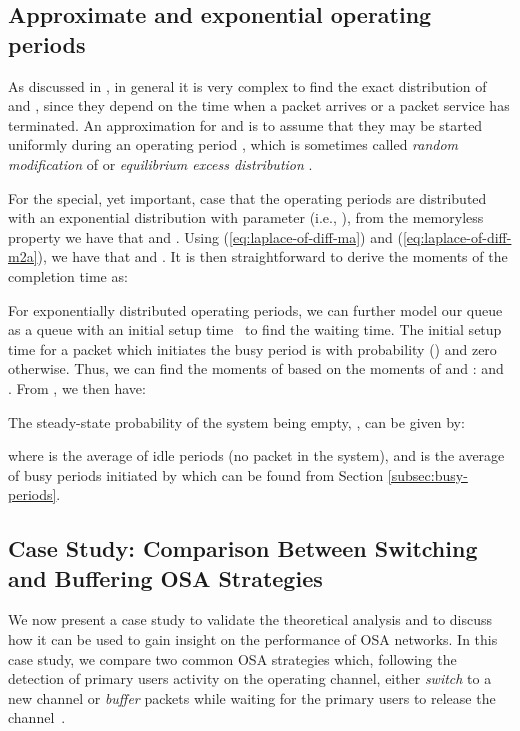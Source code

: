 \documentclass[11pt,journal,oneside,onecolumn,draftclsnofoot]{IEEEtran}
\begin{document}
\subsection{Approximate and exponential operating periods}
\label{subsec:Exp-Av-periods}

As discussed in \cite{federgruen86}, in general it is very complex to find the exact distribution of  and , since they depend on the time when a packet arrives or a packet service has terminated. An approximation for   and  is to assume that they may be started uniformly during an operating period \cite{azarfar12e}, which is sometimes called \emph{random modification} of  \cite{avi-itzhak63} or \emph{equilibrium excess distribution} \cite{federgruen86}.


For the special, yet important, case that the operating periods are distributed with an exponential distribution  with parameter  (i.e., ), from the memoryless property we have that  and . Using (\ref{eq:laplace-of-diff-ma}) and (\ref{eq:laplace-of-diff-m2a}), we have that  and . It is then straightforward to derive the moments of the completion time as:




For exponentially distributed operating periods,  we can further model our queue as a queue with an initial setup time~\cite{takagi91} to find the waiting time. The initial setup time  for a packet which initiates the busy period is  with probability () and zero otherwise. Thus, we can find the moments of  based on the moments of  and :  and . From \cite[(2.44a)]{takagi91}, we then have:

The steady-state probability of the system being empty, , can be given by: 

where  is the average of idle periods (no packet in the system), and  is the average of busy periods initiated by  which can be found from Section \ref{subsec:busy-periods}.

 
\subsection{Case Study: Comparison Between Switching and Buffering OSA Strategies}
\label{subsec:case-study}
We now present a case study to validate the theoretical analysis and to discuss how it can be used to gain insight on the performance of OSA networks. 
In this case study, we compare two common OSA strategies which, following the detection of primary users activity on the operating channel, either \emph{switch} to a new channel or \emph{buffer} packets while waiting for the primary users to release the channel~\cite{park11,lai11}.
\end{document}

